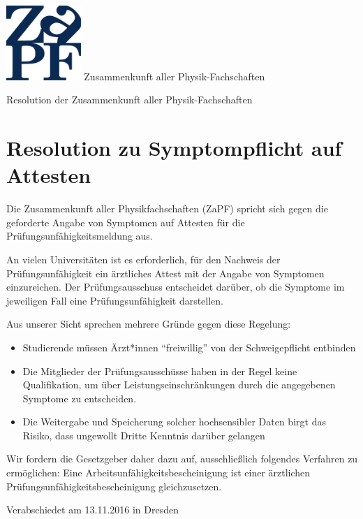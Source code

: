 \documentclass[DIV=calc]{scrartcl}
\begin{document}
\hspace{0.87\textwidth}
\begin{minipage}{120pt}
\vspace{-1.8cm}
\includegraphics[width=80pt]{logo.pdf}
\centering
\small Zusammenkunft aller Physik-Fachschaften
\end{minipage}
\begin{center}
\huge{Resolution der Zusammenkunft aller Physik-Fachschaften} \\
\normalsize
\end{center}

\vspace{1cm}
\section*{Resolution zu Symptompflicht auf Attesten}
Die Zusammenkunft aller Physikfachschaften (ZaPF) spricht sich gegen  die geforderte Angabe von Symptomen auf Attesten für die Prüfungsunfähigkeitsmeldung aus. 

An vielen Universitäten ist es erforderlich, für den Nachweis der Prüfungsunfähigkeit ein ärztliches Attest mit der Angabe von Symptomen einzureichen. Der Prüfungsausschuss entscheidet darüber, ob die Symptome im jeweiligen Fall eine Prüfungsunfähigkeit darstellen. 

Aus unserer Sicht sprechen mehrere Gründe gegen diese Regelung: 
\begin{itemize}
\item Studierende müssen Ärzt*innen “freiwillig” von der Schweigepflicht entbinden 
\item Die Mitglieder der Prüfungsausschüsse haben in der Regel keine Qualifikation, um über Leistungseinschränkungen durch die angegebenen Symptome zu entscheiden. 
\item Die Weitergabe und Speicherung solcher hochsensibler Daten birgt das Risiko, dass ungewollt Dritte Kenntnis darüber gelangen 
\end{itemize}

Wir fordern die Gesetzgeber daher dazu auf, ausschließlich folgendes Verfahren zu ermöglichen: 
Eine Arbeitsunfähigkeitsbescheinigung ist einer ärztlichen Prüfungsunfähigkeitsbescheinigung gleichzusetzen.
\vfill
\begin{flushright}
Verabschiedet am 13.11.2016 in Dresden
\end{flushright}
\end{document}
